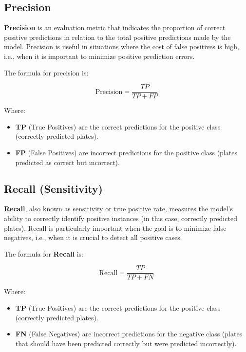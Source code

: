 \documentclass[conference]{IEEEtran}
\begin{document}
    \subsection{Precision}
    
    \textbf{Precision} is an evaluation metric that indicates the proportion of correct positive predictions in relation to the total positive predictions made by the model. Precision is useful in situations where the cost of false positives is high, i.e., when it is important to minimize positive prediction errors.
    
    The formula for precision is:
    
    \[
    \text{Precision} = \frac{TP}{TP + FP}
    \]
    
    Where:
    
    \begin{itemize}
        \item \textbf{TP} (True Positives) are the correct predictions for the positive class (correctly predicted plates).
        \item \textbf{FP} (False Positives) are incorrect predictions for the positive class (plates predicted as correct but incorrect).
    \end{itemize}
    
    \subsection{Recall (Sensitivity)}
    
    \textbf{Recall}, also known as sensitivity or true positive rate, measures the model's ability to correctly identify positive instances (in this case, correctly predicted plates). Recall is particularly important when the goal is to minimize false negatives, i.e., when it is crucial to detect all positive cases.
    
    The formula for \textbf{Recall} is:
    
    \[
    \text{Recall} = \frac{TP}{TP + FN}
    \]
    
    Where:
    
    \begin{itemize}
        \item \textbf{TP} (True Positives) are the correct predictions for the positive class (correctly predicted plates).
        \item \textbf{FN} (False Negatives) are incorrect predictions for the negative class (plates that should have been predicted correctly but were predicted incorrectly).
    \end{itemize}
    
\end{document}
